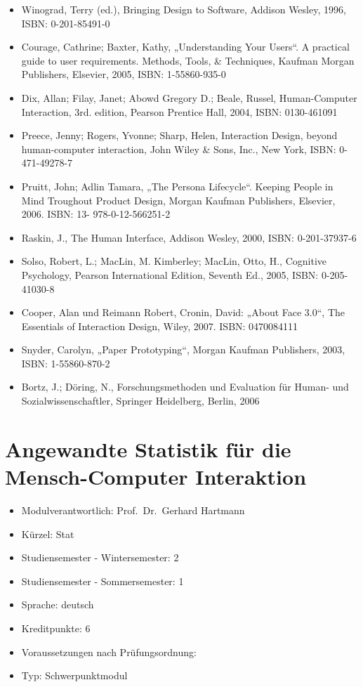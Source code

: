 \begin{itemize}
\item
  Winograd, Terry (ed.), Bringing Design to Software, Addison Wesley,
  1996, ISBN: 0-201-85491-0
\item
  Courage, Cathrine; Baxter, Kathy, „Understanding Your Users``. A
  practical guide to user requirements. Methods, Tools, \& Techniques,
  Kaufman Morgan Publishers, Elsevier, 2005, ISBN: 1-55860-935-0
\item
  Dix, Allan; Filay, Janet; Abowd Gregory D.; Beale, Russel,
  Human-Computer Interaction, 3rd. edition, Pearson Prentice Hall, 2004,
  ISBN: 0130-461091
\item
  Preece, Jenny; Rogers, Yvonne; Sharp, Helen, Interaction Design,
  beyond human-computer interaction, John Wiley \& Sons, Inc., New York,
  ISBN: 0-471-49278-7
\item
  Pruitt, John; Adlin Tamara, „The Persona Lifecycle``. Keeping People
  in Mind Troughout Product Design, Morgan Kaufman Publishers, Elsevier,
  2006. ISBN: 13- 978-0-12-566251-2
\item
  Raskin, J., The Human Interface, Addison Wesley, 2000, ISBN:
  0-201-37937-6
\item
  Solso, Robert, L.; MacLin, M. Kimberley; MacLin, Otto, H., Cognitive
  Psychology, Pearson International Edition, Seventh Ed., 2005, ISBN:
  0-205-41030-8
\item
  Cooper, Alan und Reimann Robert, Cronin, David: „About Face 3.0``, The
  Essentials of Interaction Design, Wiley, 2007. ISBN: 0470084111
\item
  Snyder, Carolyn, „Paper Prototyping``, Morgan Kaufman Publishers,
  2003, ISBN: 1-55860-870-2
\item
  Bortz, J.; Döring, N., Forschungsmethoden und Evaluation für Human-
  und Sozialwissenschaftler, Springer Heidelberg, Berlin, 2006
\end{itemize}

\chapter{Angewandte Statistik für die Mensch-Computer
Interaktion}\label{angewandte-statistik-fuxfcr-die-mensch-computer-interaktion}

\begin{itemize}
\tightlist
\item
  Modulverantwortlich: Prof.~Dr.~Gerhard Hartmann
\item
  Kürzel: Stat
\item
  Studiensemester - Wintersemester: 2
\item
  Studiensemester - Sommersemester: 1
\item
  Sprache: deutsch
\item
  Kreditpunkte: 6
\item
  Voraussetzungen nach Prüfungsordnung:
\item
  Typ: Schwerpunktmodul
\end{itemize}

